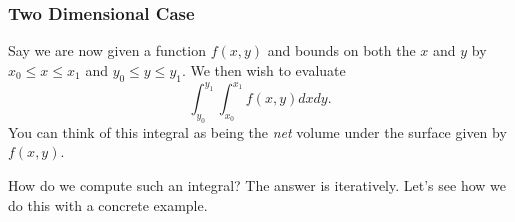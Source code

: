              	        \subsubsection{Two Dimensional Case}
             	        
             	        Say we are now given a function $f(x,y)$ and bounds on both the $x$ and $y$ by
             	        $x_0 \leq x \leq x_1$ and $y_0 \leq y \leq y_1$.  We then wish to evaluate
             	        \[
             	        \int_{y_0}^{y_1} \int_{x_0}^{x_1} f(x,y)dxdy.
             	        \]
             	        You can think of this integral as being the \emph{net} volume under the surface given by $f(x,y)$.  
             	        
             	        How do we compute such an integral? The answer is iteratively.  Let's see how we do this with a concrete example.
             	        

